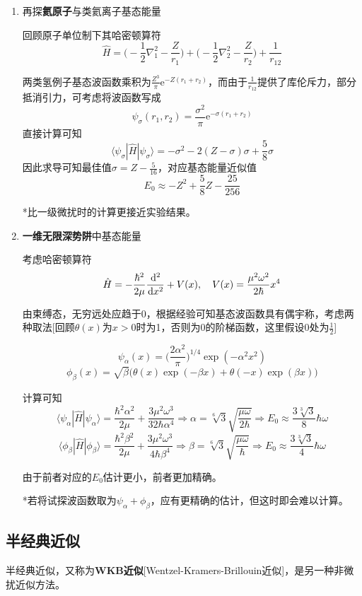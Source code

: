 \documentclass[a4paper,UTF8,fontset=windows]{ctexart}
\newcommand*{\dr}{\hspace{0.07em}\mathrm{d}}
\newcommand*{\er}{\mathrm{e}}
\newcommand*{\blk}[3]{\langle#1|#2|#3\rangle}
\begin{document}
\begin{enumerate}
    \item 再探\textbf{氦原子}与类氦离子基态能量

    回顾原子单位制下其哈密顿算符
    $$\hat{H}=\bigg(-\frac{1}{2}\nabla_1^2-\frac{Z}{r_1}\bigg)+\bigg(-\frac{1}{2}\nabla_2^2-\frac{Z}{r_2}\bigg)+\frac{1}{r_{12}}$$

    两类氢例子基态波函数乘积为$\frac{Z^3}{\pi}\er^{-Z(r_1+r_2)}$，而由于$\frac{1}{r_{12}}$提供了库伦斥力，部分抵消引力，可考虑将波函数写成
    $$\psi_\sigma(r_1,r_2)=\frac{\sigma^2}{\pi}\er^{-\sigma(r_1+r_2)}$$
    直接计算可知
    $$\blk{\psi_\sigma}{\hat{H}}{\psi_\sigma}=-\sigma^2-2(Z-\sigma)\sigma+\frac{5}{8}\sigma$$
    因此求导可知最佳值$\sigma=Z-\frac{5}{16}$，对应基态能量近似值
    $$E_0\approx-Z^2+\frac{5}{8}Z-\frac{25}{256}$$

    *比一级微扰时的计算更接近实验结果。

    \item \textbf{一维无限深势阱}中基态能量

    考虑哈密顿算符
    $$\hat{H}=-\frac{\hbar^2}{2\mu}\frac{\dr^2}{\dr x^2}+V(x),\quad V(x)=\frac{\mu^2\omega^2}{2\hbar}x^4$$

    由束缚态，无穷远处应趋于0，根据经验可知基态波函数具有偶宇称，考虑两种取法[回顾$\theta(x)$为$x>0$时为1，否则为0的阶梯函数，这里假设0处为$\frac{1}{2}$]

    $$\psi_\alpha(x)=\bigg(\frac{2\alpha^2}{\pi}\bigg)^{1/4}\exp(-\alpha^2x^2)$$
    $$\phi_\beta(x)=\sqrt{\beta}\big(\theta(x)\exp(-\beta x)+\theta(-x)\exp(\beta x)\big)$$

    计算可知
    $$\blk{\psi_\alpha}{\hat{H}}{\psi_\alpha}=\frac{\hbar^2\alpha^2}{2\mu}+\frac{3\mu^2\omega^3}{32\hbar\alpha^4}\Longrightarrow\alpha=\sqrt[6]{3}\sqrt{\frac{\mu\omega}{2\hbar}}\Longrightarrow E_0\approx\frac{3\sqrt[3]{3}}{8}\hbar\omega$$
    $$\blk{\phi_\beta}{\hat{H}}{\phi_\beta}=\frac{\hbar^2\beta^2}{2\mu}+\frac{3\mu^2\omega^3}{4\hbar\beta^4}\Longrightarrow\beta=\sqrt[6]{3}\sqrt{\frac{\mu\omega}{\hbar}}\Longrightarrow E_0\approx\frac{3\sqrt[3]{3}}{4}\hbar\omega$$

    由于前者对应的$E_0$估计更小，前者更加精确。

    *若将试探波函数取为$\psi_\alpha+\phi_\beta$，应有更精确的估计，但这时即会难以计算。
\end{enumerate}

\subsection{半经典近似}
半经典近似，又称为\textbf{WKB近似}[Wentzel-Kramers-Brillouin近似]，是另一种非微扰近似方法。
\end{document}
